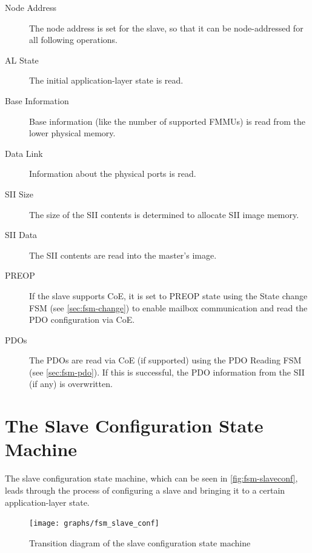 \documentclass[a4paper,12pt,BCOR6mm,bibtotoc,idxtotoc]{scrbook}
\begin{document}
\begin{description}

\item[Node Address] The node address is set for the slave, so that it can be
node-addressed for all following operations.

\item[AL State] The initial application-layer state is read.

\item[Base Information] Base information (like the number of supported FMMUs)
is read from the lower physical memory.

\item[Data Link] Information about the physical ports is read.

\item[SII Size] The size of the SII contents is determined to allocate SII
image memory.

\item[SII Data] The SII contents are read into the master's image.

\item[PREOP] If the slave supports CoE, it is set to PREOP state using the
State change FSM (see \autoref{sec:fsm-change}) to enable mailbox
communication and read the PDO configuration via CoE.

\item[PDOs] The PDOs are read via CoE (if supported) using the PDO Reading FSM
(see \autoref{sec:fsm-pdo}). If this is successful, the PDO information from
the SII (if any) is overwritten.

\end{description}


\section{The Slave Configuration State Machine}
\label{sec:fsm-conf}

The slave configuration state machine, which can be seen in
\autoref{fig:fsm-slaveconf}, leads through the process of configuring a
slave and bringing it to a certain application-layer state.

\begin{figure}[htbp]
  \centering
  \texttt{[image: graphs/fsm\_slave\_conf]}
  \caption{Transition diagram of the slave configuration state
    machine}
  \label{fig:fsm-slaveconf}
\end{figure}
\end{document}
